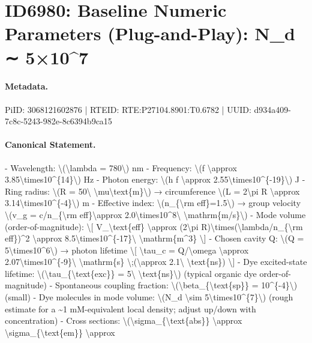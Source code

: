 \section*{ID6980: Baseline Numeric Parameters (Plug-and-Play): N\_d ∼ 5×10\textasciicircum{}7}
\paragraph{Metadata.}
PiID: 3068121602876 | RTEID: RTE:P27104.8901:T0.6782 | UUID: d934a409-7c8c-5243-982e-8c6394b9ca15

\paragraph{Canonical Statement.}
- Wavelength: \textbackslash{}(\textbackslash{}lambda = 780\textbackslash{}) nm - Frequency: \textbackslash{}(f \textbackslash{}approx 3.85\textbackslash{}times10\textasciicircum{}\{14\}\textbackslash{}) Hz - Photon energy: \textbackslash{}(h f \textbackslash{}approx 2.55\textbackslash{}times10\textasciicircum{}\{-19\}\textbackslash{}) J - Ring radius: \textbackslash{}(R = 50\textbackslash{} \textbackslash{}mu\textbackslash{}text\{m\}\textbackslash{}) → circumference \textbackslash{}(L = 2\textbackslash{}pi R \textbackslash{}approx 3.14\textbackslash{}times10\textasciicircum{}\{-4\}\textbackslash{}) m - Effective index: \textbackslash{}(n\_\{\textbackslash{}rm eff\}=1.5\textbackslash{}) → group velocity \textbackslash{}(v\_g = c/n\_\{\textbackslash{}rm eff\}\textbackslash{}approx 2.0\textbackslash{}times10\textasciicircum{}8\textbackslash{} \textbackslash{}mathrm\{m/s\}\textbackslash{}) - Mode volume (order-of-magnitude): \textbackslash{}[ V\_\textbackslash{}text\{eff\} \textbackslash{}approx (2\textbackslash{}pi R)\textbackslash{}times(\textbackslash{}lambda/n\_\{\textbackslash{}rm eff\})\textasciicircum{}2 \textbackslash{}approx 8.5\textbackslash{}times10\textasciicircum{}\{-17\}\textbackslash{} \textbackslash{}mathrm\{m\textasciicircum{}3\} \textbackslash{}] - Chosen cavity Q: \textbackslash{}(Q = 5\textbackslash{}times10\textasciicircum{}6\textbackslash{}) → photon lifetime \textbackslash{}[ \textbackslash{}tau\_c = Q/\textbackslash{}omega \textbackslash{}approx 2.07\textbackslash{}times10\textasciicircum{}\{-9\}\textbackslash{} \textbackslash{}mathrm\{s\} \textbackslash{};(\textbackslash{}approx 2.1\textbackslash{} \textbackslash{}text\{ns\}) \textbackslash{}] - Dye excited-state lifetime: \textbackslash{}(\textbackslash{}tau\_\{\textbackslash{}text\{exc\}\} = 5\textbackslash{} \textbackslash{}text\{ns\}\textbackslash{}) (typical organic dye order-of-magnitude) - Spontaneous coupling fraction: \textbackslash{}(\textbackslash{}beta\_\{\textbackslash{}text\{sp\}\} = 10\textasciicircum{}\{-4\}\textbackslash{}) (small) - Dye molecules in mode volume: \textbackslash{}(N\_d \textbackslash{}sim 5\textbackslash{}times10\textasciicircum{}\{7\}\textbackslash{}) (rough estimate for a \textasciitilde{}1 mM-equivalent local density; adjust up/down with concentration) - Cross sections: \textbackslash{}(\textbackslash{}sigma\_\{\textbackslash{}text\{abs\}\} \textbackslash{}approx \textbackslash{}sigma\_\{\textbackslash{}text\{em\}\} \textbackslash{}approx 